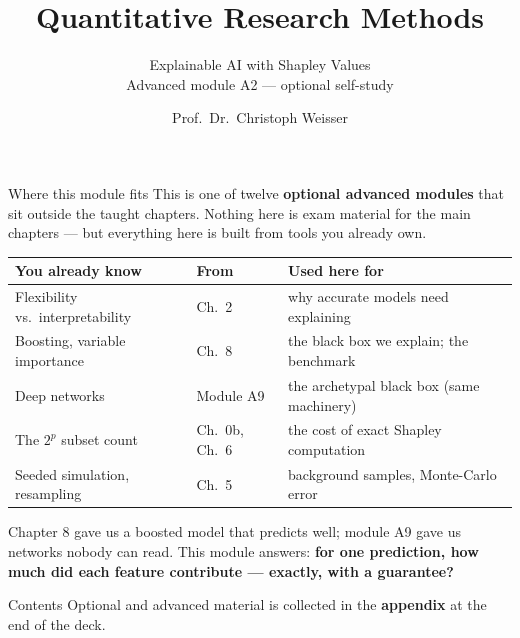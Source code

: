 \documentclass[aspectratio=169,11pt]{beamer}
\title{Quantitative Research Methods}
\subtitle{Explainable AI with Shapley Values\\[2pt]{\small Advanced module A2 --- optional self-study}}
\author{Prof.\ Dr.\ Christoph Weisser}
\date{}\graphicspath{{images/}}
\begin{document}
\begin{frame}[plain]\titlepage\end{frame}

\begin{frame}{Where this module fits}
  \footnotesize
  This is one of twelve \textbf{optional advanced modules} that sit outside the taught chapters.
  Nothing here is exam material for the main chapters --- but everything here is built
  from tools you already own.
  \begin{center}
  \begin{tabular}{@{}lll@{}}
    \toprule
    \textbf{You already know} & \textbf{From} & \textbf{Used here for} \\
    \midrule
    Flexibility vs.\ interpretability & Ch.\ 2 & why accurate models need explaining \\
    Boosting, variable importance & Ch.\ 8 & the black box we explain; the benchmark \\
    Deep networks & Module A9 & the archetypal black box (same machinery) \\
    The $2^p$ subset count & Ch.\ 0b, Ch.\ 6 & the cost of exact Shapley computation \\
    Seeded simulation, resampling & Ch.\ 5 & background samples, Monte-Carlo error \\
    \bottomrule
  \end{tabular}
  \end{center}
  \vspace{2pt}
  \begin{takeaway}
    Chapter 8 gave us a boosted model that predicts well; module A9 gave us networks
    nobody can read. This module answers: \textbf{for one prediction, how much did each
    feature contribute --- exactly, with a guarantee?}
  \end{takeaway}
\end{frame}

\begin{frame}{Contents}\small\tableofcontents[hideallsubsections]
  \vfill
  {\tiny Optional and advanced material is collected in the \textbf{appendix} at the end of the deck.}
\end{frame}
\end{document}

